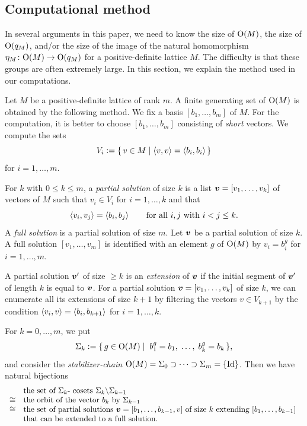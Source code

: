 \documentclass{amsart} %
\begin{document}
\subsection{Computational method}\label{subsec:computational}
%
In several arguments in this paper, 
we need to know the size of $\mathord{\mathrm{O}}(M)$,
the size of $\mathord{\mathrm{O}}(q_M)$, and/or 
the size of the image of the natural homomorphism
$\eta_M\colon \mathord{\mathrm{O}}(M) \to \mathord{\mathrm{O}}(q_M)$
for a positive-definite lattice $M$.
The difficulty is that these groups are often extremely large.
In this section, we explain the method used in our computations.
%
\par
%
Let $M$ be a positive-definite lattice of rank $m$.
A finite generating set of $\mathord{\mathrm{O}}(M)$ is obtained by the following method.
We fix a basis $[b_1, \dots, b_m]$ of $M$.
For the computation,
 it is better to choose $[b_1, \dots, b_m]$
 consisting of \emph{short} vectors.
 We compute the sets 
\[
V_i:=\{\,{v\in M}\mid {\langle v, v \rangle=\langle b_i, b_i \rangle} \,\}
\]
for $i=1, \dots, m$.
%
\begin{definition}\label{def:solutions}
For $k$ with $0\le k\le m$,
a \emph{partial solution} of size $k$ is a list 
$\boldsymbol{v}=[v_1, \dots, v_k]$ of vectors of $M$ 
such that $v_i\in V_i$ for $i=1, \dots, k$ and that 
\[
\langle v_i, v_j \rangle=\langle b_i, b_j \rangle\;\;\quad\;\;\textrm{for all $i, j$ with $i<j\le k$.}
\]
A \emph{full solution} is a partial solution of size $m$.
Let $\boldsymbol{v}$ be a partial solution of size $k$.
A full solution $[v_1, \dots, v_m]$ is identified with an element $g$ 
of $\mathord{\mathrm{O}}(M)$ by $v_i=b_i^g$ for $ i=1, \dots, m$.
\par
A partial solution $\boldsymbol{v}^{\prime}$ of size $\ge k$ is
an \emph{extension} of $\boldsymbol{v}$ 
if the initial segment of $\boldsymbol{v}^{\prime}$ of length $k$ is equal to $\boldsymbol{v}$.
For a partial solution $\boldsymbol{v}=[v_1, \dots, v_k]$ of size $k$,
we can enumerate all its extensions of size $k+1$ by filtering the vectors $v\in V_{k+1}$
by the condition $\langle v_i, v \rangle=\langle b_i, b_{k+1} \rangle$ for $i=1, \dots, k$.
\end{definition}
%
%
%
For $k=0, \dots, m$, 
we put
\[
\Sigma_k:=\{\,{g\in \mathord{\mathrm{O}}(M)}\mid {\;b_1^g=b_1, \;\dots, \; b_k^g=b_k} \,\},
\]
and consider the \emph{stabilizer-chain} 
$\mathord{\mathrm{O}}(M)=\Sigma_0\supset \dots\supset \Sigma_m=\{\mathord{\mathrm{Id}}\}$.
Then we have natural bijections
\[
\begin{array}{cl}
&\textrm{the set of $\Sigma_{k}$- cosets $\Sigma_{k}\backslash\Sigma_{k-1}$}\\
\cong &\textrm{the orbit of the vector $b_k$ by $\Sigma_{k-1}$ }\\
\cong &\textrm{the set of partial solutions $\boldsymbol{v}=[b_1, \dots, b_{k-1}, v]$ of size $k$ 
 extending $[b_1, \dots, b_{k-1}]$ }\\
&\textrm{that can be extended to a full solution.}
\end{array}
\]
\end{document}
